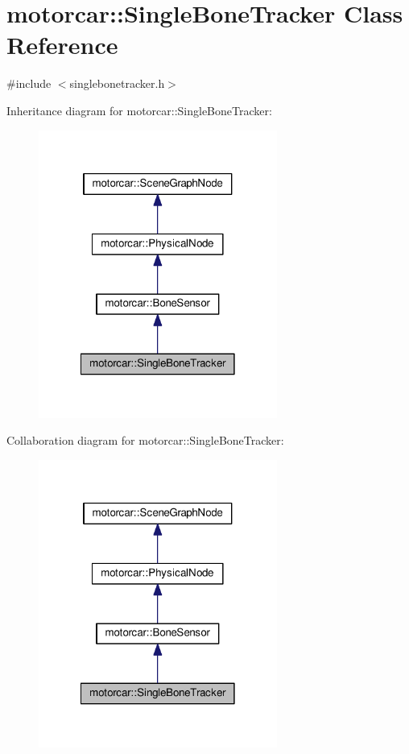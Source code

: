 \hypertarget{classmotorcar_1_1SingleBoneTracker}{\section{motorcar\-:\-:Single\-Bone\-Tracker Class Reference}
\label{classmotorcar_1_1SingleBoneTracker}
}


{\ttfamily \#include $<$singlebonetracker.\-h$>$}



Inheritance diagram for motorcar\-:\-:Single\-Bone\-Tracker\-:
\nopagebreak
\begin{figure}[H]
\begin{center}
\leavevmode
\includegraphics[width=222pt]{classmotorcar_1_1SingleBoneTracker__inherit__graph}
\end{center}
\end{figure}


Collaboration diagram for motorcar\-:\-:Single\-Bone\-Tracker\-:
\nopagebreak
\begin{figure}[H]
\begin{center}
\leavevmode
\includegraphics[width=222pt]{classmotorcar_1_1SingleBoneTracker__coll__graph}
\end{center}
\end{figure}
